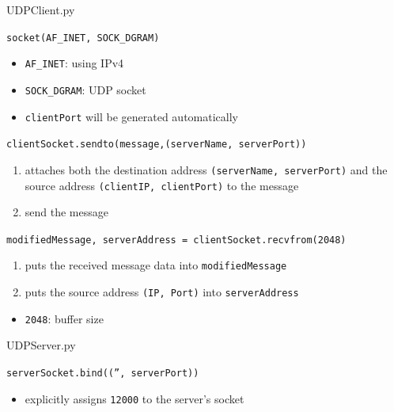 \begin{frame}[t,allowframebreaks]{UDPClient.py}
  \begin{center}
  \end{center}
  \begin{block}{\texttt{socket(AF\_INET, SOCK\_DGRAM)}}
    \begin{itemize}
    \item \texttt{AF\_INET}: using IPv4
    \item \texttt{SOCK\_DGRAM}: UDP socket
    \item \texttt{clientPort} will be generated automatically
    \end{itemize}
  \end{block}
  \begin{block}{\texttt{clientSocket.sendto(message,(serverName, serverPort))}}
    \begin{enumerate}
    \item attaches both the destination address \texttt{(serverName, serverPort)} and the
      source address \texttt{(clientIP, clientPort)} to the message
    \item send the message
    \end{enumerate}
  \end{block}
  \begin{block}{\texttt{modifiedMessage, serverAddress = clientSocket.recvfrom(2048)}}
    \begin{enumerate}
    \item puts the received message data into \texttt{modifiedMessage}
    \item puts the source address \texttt{(IP, Port)} into \texttt{serverAddress}
    \end{enumerate}
    \begin{itemize}
    \item \texttt{2048}: buffer size
    \end{itemize}
  \end{block}
\end{frame}

\begin{frame}{UDPServer.py}
  \begin{center}
  \end{center}
  \begin{block}{\texttt{serverSocket.bind(('', serverPort))}}
    \begin{itemize}
    \item explicitly assigns \texttt{12000} to the server's socket
    \end{itemize}
  \end{block}
\end{frame}

